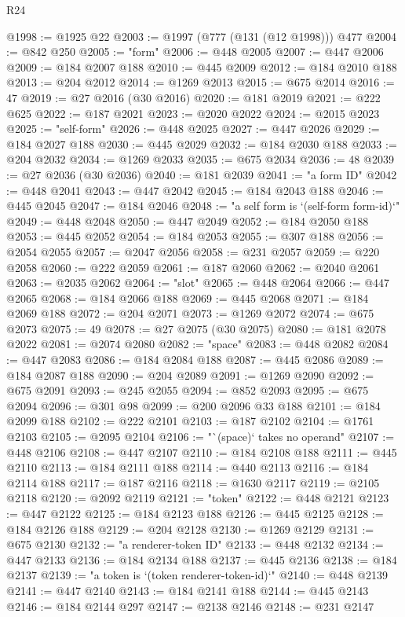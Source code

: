 \begin{lexlean}{R24}
\begin{coremodule}
@1998 := @1925 @22
@2003 := @1997 (@777 (@131 (@12 @1998))) @477
@2004 := @842 @250
@2005 := "form"
@2006 := @448 @2005
@2007 := @447 @2006
@2009 := @184 @2007 @188
@2010 := @445 @2009
@2012 := @184 @2010 @188
@2013 := @204 @2012
@2014 := @1269 @2013
@2015 := @675 @2014
@2016 := 47
@2019 := @27 @2016 (@30 @2016)
@2020 := @181 @2019
@2021 := @222 @625
@2022 := @187 @2021
@2023 := @2020 @2022
@2024 := @2015 @2023
@2025 := "self-form"
@2026 := @448 @2025
@2027 := @447 @2026
@2029 := @184 @2027 @188
@2030 := @445 @2029
@2032 := @184 @2030 @188
@2033 := @204 @2032
@2034 := @1269 @2033
@2035 := @675 @2034
@2036 := 48
@2039 := @27 @2036 (@30 @2036)
@2040 := @181 @2039
@2041 := "a form ID"
@2042 := @448 @2041
@2043 := @447 @2042
@2045 := @184 @2043 @188
@2046 := @445 @2045
@2047 := @184 @2046
@2048 := "a self form is `(self-form form-id)`"
@2049 := @448 @2048
@2050 := @447 @2049
@2052 := @184 @2050 @188
@2053 := @445 @2052
@2054 := @184 @2053
@2055 := @307 @188
@2056 := @2054 @2055
@2057 := @2047 @2056
@2058 := @231 @2057
@2059 := @220 @2058
@2060 := @222 @2059
@2061 := @187 @2060
@2062 := @2040 @2061
@2063 := @2035 @2062
@2064 := "slot"
@2065 := @448 @2064
@2066 := @447 @2065
@2068 := @184 @2066 @188
@2069 := @445 @2068
@2071 := @184 @2069 @188
@2072 := @204 @2071
@2073 := @1269 @2072
@2074 := @675 @2073
@2075 := 49
@2078 := @27 @2075 (@30 @2075)
@2080 := @181 @2078 @2022
@2081 := @2074 @2080
@2082 := "space"
@2083 := @448 @2082
@2084 := @447 @2083
@2086 := @184 @2084 @188
@2087 := @445 @2086
@2089 := @184 @2087 @188
@2090 := @204 @2089
@2091 := @1269 @2090
@2092 := @675 @2091
@2093 := @245 @2055
@2094 := @852 @2093
@2095 := @675 @2094
@2096 := @301 @98
@2099 := @200 @2096 @33 @188
@2101 := @184 @2099 @188
@2102 := @222 @2101
@2103 := @187 @2102
@2104 := @1761 @2103
@2105 := @2095 @2104
@2106 := "`(space)` takes no operand"
@2107 := @448 @2106
@2108 := @447 @2107
@2110 := @184 @2108 @188
@2111 := @445 @2110
@2113 := @184 @2111 @188
@2114 := @440 @2113
@2116 := @184 @2114 @188
@2117 := @187 @2116
@2118 := @1630 @2117
@2119 := @2105 @2118
@2120 := @2092 @2119
@2121 := "token"
@2122 := @448 @2121
@2123 := @447 @2122
@2125 := @184 @2123 @188
@2126 := @445 @2125
@2128 := @184 @2126 @188
@2129 := @204 @2128
@2130 := @1269 @2129
@2131 := @675 @2130
@2132 := "a renderer-token ID"
@2133 := @448 @2132
@2134 := @447 @2133
@2136 := @184 @2134 @188
@2137 := @445 @2136
@2138 := @184 @2137
@2139 := "a token is `(token renderer-token-id)`"
@2140 := @448 @2139
@2141 := @447 @2140
@2143 := @184 @2141 @188
@2144 := @445 @2143
@2146 := @184 @2144 @297
@2147 := @2138 @2146
@2148 := @231 @2147

\end{coremodule}
\end{lexlean}
